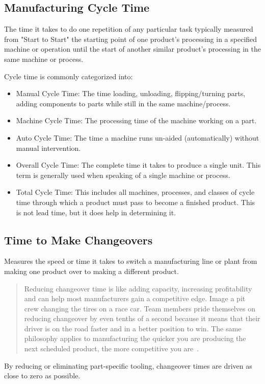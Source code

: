 \subsection{Manufacturing Cycle Time}
The time it takes to do one repetition of any particular task typically measured from "Start to Start" the starting point of one product's processing in a specified machine or operation until the start of another similar product's processing in the same machine or process.

Cycle time is commonly categorized into:
\begin{itemize}
\item Manual Cycle Time: The time loading, unloading, flipping/turning parts, adding components to parts while still in the same machine/process.
\item Machine Cycle Time: The processing time of the machine working on a part.
\item Auto Cycle Time: The time a machine runs un-aided (automatically) without manual intervention.
\item Overall Cycle Time: The complete time it takes to produce a single unit. This term is generally used when speaking of a single machine or process.
\item Total Cycle Time: This includes all machines, processes, and classes of cycle time through which a product must pass to become a finished product. This is not lead time, but it does help in determining it.
\end{itemize}
\subsection{Time to Make Changeovers}
Measures the speed or time it takes to switch a manufacturing line or plant
from making one product over to making a different product.

\begin{quote}
Reducing changeover time is like adding capacity, increasing profitability and
can help most manufacturers gain a competitive edge. Image a pit crew changing
the tires on a race car. Team members pride themselves on reducing changeover
by even tenths of a second because it means that their driver is on the road faster
and in a better position to win. The same philosophy applies to manufacturing
the quicker you are producing the next scheduled product, the more competitive
you are~\cite{changeover-time-website}.
\end{quote}
By reducing or eliminating part-specific tooling, changeover times are driven as close to zero as possible.





